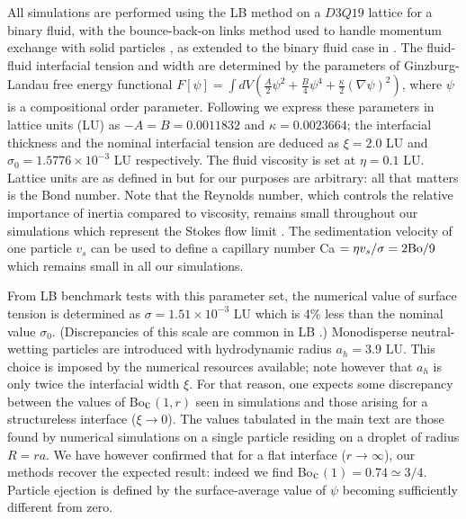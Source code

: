 \documentclass[aps,prl,superscriptaddress,twocolumn,showpacs,floatfix]{revtex4-1}
\newcommand{\Bocm}{Bo$_{\hbox{\rm c}}$}
\begin{document}
All simulations are performed using the LB method on a $D3Q19$ lattice for
a binary fluid, with the bounce-back-on links method used to handle momentum exchange with solid particles \cite{Bounce}, as extended to the binary fluid case in \cite{stratford:2005/a}. The fluid-fluid interfacial tension and width are determined by the parameters of Ginzburg-Landau free energy functional $F[\psi]= \int dV \left( \frac{A}{2}\psi^2 + \frac{B}{4}\psi^4 +  \frac{\kappa}{2}(\nabla \psi)^2 \right)$, where $\psi$ is a compositional order parameter.
Following \cite{kendon:2001/a,kim:one} we express these parameters in lattice units (LU) as $-A=B=0.0011832$ and $\kappa=0.0023664$; the interfacial thickness and the nominal interfacial tension are deduced as $\xi=2.0$ LU and $\sigma_0=1.5776\times10^{-3}$ LU respectively. The fluid viscosity is set at $\eta=0.1$ LU. Lattice units are as defined in \cite{kim:one} but for our purposes are arbitrary: all that matters is the Bond number. Note that the Reynolds number, which controls the relative importance of inertia compared to viscosity, remains small throughout our simulations which represent the Stokes flow limit \cite{kim:one}. The sedimentation velocity of one particle $v_s$ can be used to define a capillary number Ca $=\eta v_s/\sigma = 2{\rm Bo}/9$ which remains small in all our simulations.
 
From LB benchmark tests with this parameter set, the numerical value of surface tension is determined as $\sigma = 1.51 \times 10^{-3}$ LU which is 4\% less than the nominal value $\sigma_0$. (Discrepancies of this scale are common in LB \cite{kendon:2001/a}.) Monodisperse neutral-wetting particles are introduced with hydrodynamic radius $a_h=3.9$ LU. This choice is imposed by the numerical resources available; note however that $a_h$ is only twice the interfacial width $\xi$. For that reason, one expects some discrepancy between the values of \Bocm $(1,r)$ seen in simulations and those arising for a structureless interface ($\xi\to 0$). The values tabulated in the main text are those found by numerical simulations on a single particle residing on a droplet of radius $R = ra$. We have however confirmed that for a flat interface ($r\to\infty$), our methods recover the expected result: indeed we find \Bocm $(1) = 0.74\simeq 3/4$. Particle ejection is defined by the surface-average value of $\psi$ becoming sufficiently different from zero.
\end{document}
